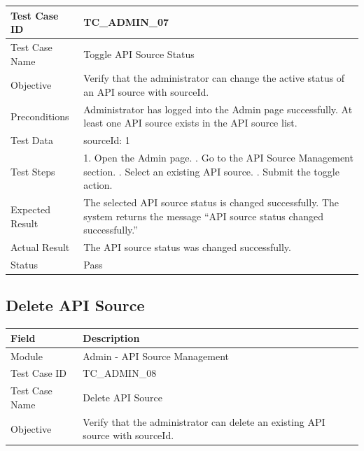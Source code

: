 \documentclass[12pt,a4paper]{article}
\begin{document}
{{\begin{longtable}{|p{4cm}|p{10cm}|}
	Test Case ID & TC\_ADMIN\_07 \\ \hline
	
	Test Case Name & Toggle API Source Status \\ \hline
	
	Objective &
	Verify that the administrator can change the active status of an API source with sourceId. \\ \hline
	
	Preconditions &
	Administrator has logged into the Admin page successfully. \newline
	At least one API source exists in the API source list.
	\\ \hline
	
	Test Data &
	sourceId: 1
	\\ \hline
	
	Test Steps &
	1. Open the Admin page. \newline
	2. Go to the API Source Management section. \newline
	3. Select an existing API source. \newline
	4. Submit the toggle action.
	\\ \hline
	
	Expected Result &
	The selected API source status is changed successfully. The system returns the message ``API source status changed successfully.'' \\ \hline
	
	Actual Result &
	The API source status was changed successfully. \\ \hline
	
	Status & Pass \\ \hline
	
\end{longtable}
\subsection{Delete API Source}
\begin{longtable}{|p{4cm}|p{10cm}|}
	\hline
	\textbf{Field} & \textbf{Description} \\ \hline
	
	Module & Admin - API Source Management \\ \hline
	
	Test Case ID & TC\_ADMIN\_08 \\ \hline
	
	Test Case Name & Delete API Source \\ \hline
	
	Objective &
	Verify that the administrator can delete an existing API source with sourceId. \\ \hline
	

\end{longtable}}}
\end{document}
